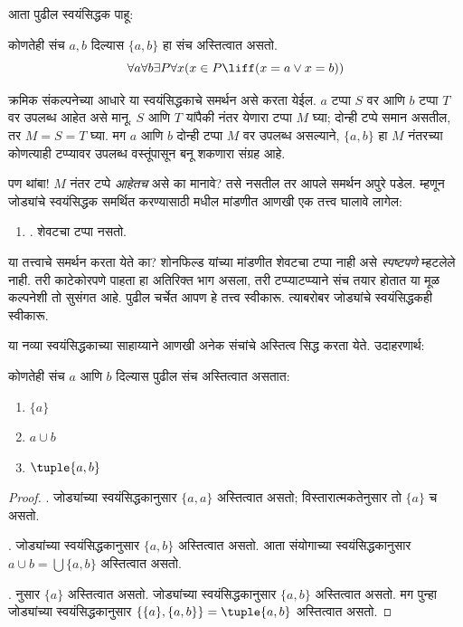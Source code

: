 \documentclass[../../../include/open-logic-section]{subfiles}
\begin{document}

आता पुढील स्वयंसिद्धक पाहू:

\begin{axiom}[जोड्या]
कोणतेही संच $a, b$ दिल्यास $\{a, b\}$ हा संच अस्तित्वात असतो.
\[
	\forall a \forall b \exists P \forall x (x \in P \liff (x = a \lor x = b))
\]
\end{axiom}

क्रमिक संकल्पनेच्या आधारे या स्वयंसिद्धकाचे समर्थन असे करता येईल. $a$ टप्पा $S$ वर आणि $b$ टप्पा $T$ वर उपलब्ध आहेत असे मानू. $S$ आणि $T$ यांपैकी नंतर येणारा टप्पा $M$ घ्या; दोन्ही टप्पे समान असतील, तर $M=S=T$ घ्या. मग $a$ आणि $b$ दोन्ही टप्पा $M$ वर उपलब्ध असल्याने, $\{a,b\}$ हा $M$ नंतरच्या कोणत्याही टप्प्यावर उपलब्ध वस्तूंपासून बनू शकणारा संग्रह आहे.

पण थांबा!{} $M$ नंतर टप्पे \emph{आहेतच} असे का मानावे? तसे नसतील तर आपले समर्थन अपुरे पडेल. म्हणून जोड्यांचे स्वयंसिद्धक समर्थित करण्यासाठी  मधील मांडणीत आणखी एक तत्त्व घालावे लागेल:
\begin{enumerate}
\item[] \stagessucc. शेवटचा टप्पा नसतो.
\end{enumerate}
या तत्त्वाचे समर्थन करता येते का? शोनफिल्ड यांच्या मांडणीत शेवटचा टप्पा नाही असे \emph{स्पष्टपणे} म्हटलेले नाही. तरी काटेकोरपणे पाहता हा अतिरिक्त भाग असला, तरी टप्प्याटप्प्याने संच तयार होतात या मूळ कल्पनेशी तो सुसंगत आहे. पुढील चर्चेत आपण हे तत्त्व स्वीकारू. त्याबरोबर जोड्यांचे स्वयंसिद्धकही स्वीकारू.

या नव्या स्वयंसिद्धकाच्या साहाय्याने आणखी अनेक संचांचे अस्तित्व सिद्ध करता येते. उदाहरणार्थ:

\begin{prop}
कोणतेही संच $a$ आणि $b$ दिल्यास पुढील संच अस्तित्वात असतात:
\begin{enumerate}
\item{} $\{a\}$
\item{} $a \cup b$
\item{} $\tuple{a, b}$
\end{enumerate}
\end{prop}

\begin{proof}
. जोड्यांच्या स्वयंसिद्धकानुसार $\{a, a\}$ अस्तित्वात असतो; विस्तारात्मकतेनुसार तो $\{a\}$ च असतो.

. जोड्यांच्या स्वयंसिद्धकानुसार $\{a, b\}$ अस्तित्वात असतो. आता संयोगाच्या स्वयंसिद्धकानुसार $a \cup b = \bigcup
\{a, b\}$ अस्तित्वात असतो.

.  नुसार $\{a\}$ अस्तित्वात असतो. जोड्यांच्या स्वयंसिद्धकानुसार $\{a,
b\}$ अस्तित्वात असतो. मग पुन्हा जोड्यांच्या स्वयंसिद्धकानुसार $\{\{a\}, \{a, b\}\} = \tuple{a, b}$ अस्तित्वात असतो.
\end{proof}
\end{document}
